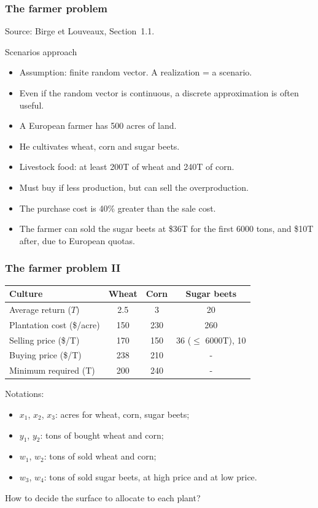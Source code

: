 \documentclass{beamer}
\def\blue{\color{blue}}
\begin{document}
\begin{frame}
\frametitle{The farmer problem}

Source: Birge et Louveaux, Section~1.1.

\mbox{}

{\blue Scenarios approach}
\begin{itemize}
\item
Assumption: finite random vector. A realization = a scenario.
\item
Even if the random vector is continuous, a discrete approximation is often useful.
\end{itemize}

\mbox{}

\begin{itemize}
\item
A European farmer has 500 acres of land.
\item
He cultivates wheat, corn and sugar beets.
\item
Livestock food: at least 200T of wheat and 240T of corn.
\item
Must buy if less production, but can sell the overproduction.
\item
The purchase cost is 40\% greater than the sale cost.
\item
The farmer can sold the sugar beets at \$36T for the first 6000 tons, and \$10T after, due to European quotas.
\end{itemize}

\end{frame}

\begin{frame}
\frametitle{The farmer problem II}

\begin{center}
\begin{tabular}{lccc}
\hline
Culture & Wheat & Corn & Sugar beets \\
\hline
Average return ($T$) & 2.5 & 3 & 20 \\
Plantation cost (\$/acre) & 150 & 230 & 260 \\
Selling price (\$/T) & 170 & 150 & 36 ($\leq$ 6000T), 10 \\
Buying price (\$/T) & 238 & 210 & - \\
Minimum required (T) & 200 & 240 & - \\
\hline
\end{tabular}
\end{center}

\mbox{}

Notations:
\begin{itemize}
\item
$x_1$, $x_2$, $x_3$: acres for wheat, corn, sugar beets;
\item
$y_1$, $y_2$: tons of bought wheat and corn;
\item
$w_1$, $w_2$: tons of sold wheat and corn;
\item
$w_3$, $w_4$: tons of sold sugar beets, at high price and at low price.
\end{itemize}

\mbox{}

How to decide the surface to allocate to each plant?

\end{frame}
\end{document}
